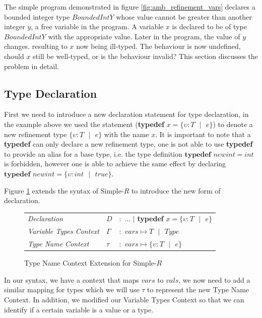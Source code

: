\documentclass[a4paper,12pt]{report}
\begin{document}
\par
The simple program demonstrated in figure \ref{fig:amb_refinement_vars} declares a 
bounded integer type $BoundedIntY$ whose value cannot be greater than another integer $y$, 
a free variable in the program. A variable $x$ is declared to be of type 
$BoundedIntY$ with the appropriate value. Later in the program, the value of $y$ 
changes. resulting to $x$ now being ill-typed. The behaviour is now undefined, 
should $x$ still be well-typed, or is the behaviour invalid? This section 
discusses the problem in detail. 

\subsection{Type Declaration}
First we need to introduce a new declaration statement for type declaration, 
in the example above we used the statement 
(\textbf{typedef} $x = \{\upsilon : T\text{ }|\text{ }e\}$) to denote a 
new refinement type $\{\upsilon : T\text{ }|\text{ }e\}$ with the name $x$. It is 
important to note that a \textbf{typedef} can only declare a new refinement type, one is 
not able to use \textbf{typedef} to provide an alias for a base type, i.e. the type 
definition $\textbf{typedef } newint = int$ is forbidden, however one is able to achieve the 
same effect by declaring $\textbf{typedef }newint = \{\upsilon : int\text{ }|\text{ }true\}$.

\par
Figure \ref{fig:typedef-extend} extends the syntax of Simple-$R$ to introduce 
the new form of declaration.
\begin{figure}[H]
  \begin{center}
    \begin{tabular} {l l l}
      \textit{Declaration} & $D$ & $:$ ... $|$ \textbf{typedef }$x = \{\upsilon : T\text{ }|\text{ }e\}$\\
      \textit{Variable Types Context} & $\Gamma$& $:$ $vars \mapsto T\text{ }|\text{ }Type$\\
      \textit{Type Name Context} & $\tau$& $:$ $vars \mapsto \{\upsilon : T\text{ }|\text{ }e\}$ \\
    \end{tabular}
  \end{center}
  \caption{Type Name Context Extension for Simple-$R$}
  \label{fig:typedef-extend}
\end{figure}

\par
In our syntax, we have a context that maps $vars$ to $vals$, we now need to 
add a similar mapping for types which we will use $\tau$ to represent the new 
Type Name Context. In addition, we modified our Variable Types Context 
so that we can identify if a certain variable is a value or a type. 
\end{document}
